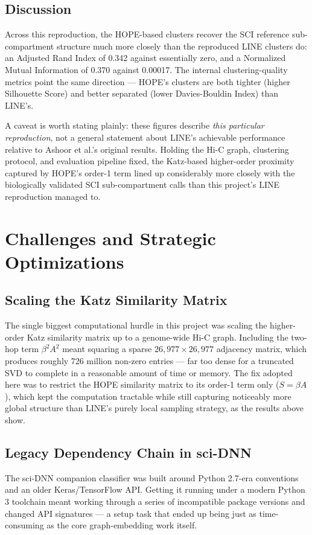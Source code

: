 \documentclass[12pt]{article}
\begin{document}
\subsection{Discussion}
Across this reproduction, the HOPE-based clusters recover the SCI reference sub-compartment
structure much more closely than the reproduced LINE clusters do: an Adjusted Rand Index of
0.342 against essentially zero, and a Normalized Mutual Information of 0.370 against 0.00017.
The internal clustering-quality metrics point the same direction — HOPE's clusters are both
tighter (higher Silhouette Score) and better separated (lower Davies-Bouldin Index) than LINE's.

A caveat is worth stating plainly: these figures describe \textit{this particular reproduction},
not a general statement about LINE's achievable performance relative to Ashoor et al.'s original
results. Holding the Hi-C graph, clustering protocol, and evaluation pipeline fixed, the
Katz-based higher-order proximity captured by HOPE's order-1 term lined up considerably more
closely with the biologically validated SCI sub-compartment calls than this project's LINE
reproduction managed to.

\section{Challenges and Strategic Optimizations}

\subsection{Scaling the Katz Similarity Matrix}
The single biggest computational hurdle in this project was scaling the higher-order Katz
similarity matrix up to a genome-wide Hi-C graph. Including the two-hop term $\beta^2 A^2$ meant
squaring a sparse $26{,}977 \times 26{,}977$ adjacency matrix, which produces roughly 726 million
non-zero entries — far too dense for a truncated SVD to complete in a reasonable amount of time
or memory. The fix adopted here was to restrict the HOPE similarity matrix to its order-1 term
only ($S = \beta A$), which kept the computation tractable while still capturing noticeably more
global structure than LINE's purely local sampling strategy, as the results above show.

\subsection{Legacy Dependency Chain in sci-DNN}
The sci-DNN companion classifier was built around Python 2.7-era conventions and an older
Keras/TensorFlow API. Getting it running under a modern Python 3 toolchain meant working through
a series of incompatible package versions and changed API signatures — a setup task that ended
up being just as time-consuming as the core graph-embedding work itself.
\end{document}

